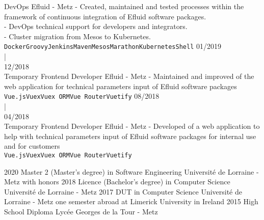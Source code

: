 \documentclass[8pt]{cv} %
\begin{document}
\begin{entrylist}
		{DevOps}
		{Efluid - Metz}
		{- Created, maintained and tested processes within the framework of continuous integration of Efluid software packages.  \\
- DevOps technical support for developers and integrators.\\
- Cluster migration from Mesos to Kubernetes.\\
\texttt{Docker}\slashsep\texttt{Groovy}\slashsep\texttt{Jenkins}\slashsep\texttt{Maven}\slashsep\texttt{Mesos}\slashsep\texttt{Marathon}\slashsep\texttt{Kubernetes}\slashsep\texttt{Shell}}
	\entry
		{01/2019\vspace{0.1cm}\\\hspace*{0.6cm}|\vspace{0.1cm}\\ 12/2018\\\footnotesize{Temporary}}
		{Frontend Developer}
		{Efluid - Metz}
		{- Maintained and improved of the web application for technical parameters input of Efluid software packages \\ \texttt{Vue.js}\slashsep\texttt{Vuex}\slashsep\texttt{Vuex ORM}\slashsep\texttt{Vue Router}\slashsep\texttt{Vuetify}}
	\entry
		{08/2018\vspace{0.25cm}\\\hspace*{0.6cm}|\vspace{0.25cm}\\ 04/2018\\\footnotesize{Temporary}}
		{Frontend Developer}
		{Efluid - Metz}
		{- Developed of a web application to help with technical parameters input of Efluid software packages for internal use and for customers \\ \texttt{Vue.js}\slashsep\texttt{Vuex}\slashsep\texttt{Vuex ORM}\slashsep\texttt{Vue Router}\slashsep\texttt{Vuetify}}
\end{entrylist}




\begin{entrylist}
	\entry
		{2020}
		{Master 2 (Master's degree) in Software Engineering}
		{Université de Lorraine - Metz}
		{with honors}
	\entry
		{2018}
		{Licence (Bachelor's degree) in Computer Science}
		{Université de Lorraine - Metz}
		{}
	\entry
		{2017}
		{DUT in Computer Science}
		{Université de Lorraine - Metz}
		{one semester abroad at Limerick University in Ireland}
	\entry
		{2015}
		{High School Diploma}
		{Lycée Georges de la Tour - Metz}
		{}
\end{entrylist}
\end{document}
